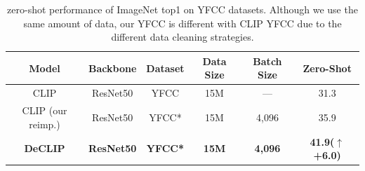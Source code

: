 





\begin{table}[h]
\caption{\label{tab:ablation on YFCC} \workname zero-shot performance of ImageNet top1 on YFCC datasets. Although we use the same amount of data, our YFCC is different with CLIP YFCC due to the different data cleaning strategies.}
\begin{center}
\begin{small}
\begin{sc}
\begin{tabular}{cccccc}
  \toprule  
  \textbf{Model} &\textbf{Backbone} & \textbf{Dataset}   & \textbf{Data Size}   &\textbf{Batch Size}  & \textbf{Zero-Shot} \\
  \midrule   
  CLIP &ResNet50 &YFCC               &15M  & — &31.3 	\\
  CLIP (our reimp.) & ResNet50 &YFCC*    &15M  & 4,096 &35.9 \\
  \textbf{DeCLIP} &\textbf{ResNet50} &\textbf{YFCC*} &\textbf{15M}  &\textbf{4,096} &\textbf{41.9($\uparrow$+6.0)} 	\\
  \bottomrule
\end{tabular}
\end{sc}
\end{small}
\end{center}
\end{table}


